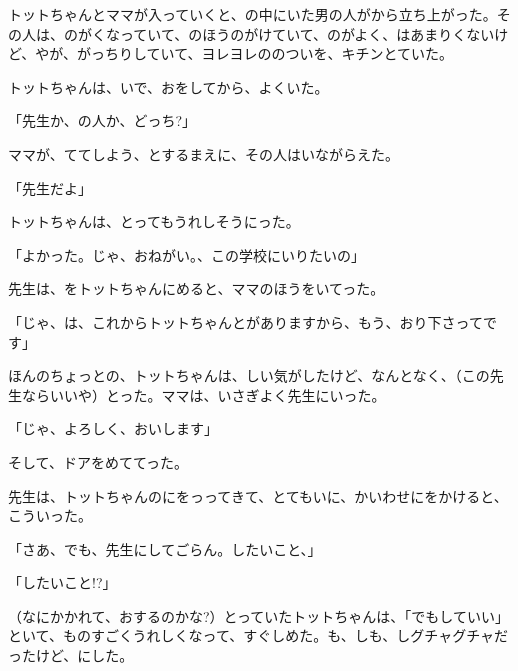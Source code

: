トットちゃんとママが入っていくと、の中にいた男の人がから立ち上がった。その人は、のがくなっていて、のほうのがけていて、のがよく、はあまりくないけど、やが、がっちりしていて、ヨレヨレののついを、キチンとていた。

トットちゃんは、いで、おをしてから、よくいた。

「先生か、の人か、どっち?」

ママが、ててしよう、とするまえに、その人はいながらえた。

「先生だよ」

トットちゃんは、とってもうれしそうにった。

「よかった。じゃ、おねがい。、この学校にいりたいの」

先生は、をトットちゃんにめると、ママのほうをいてった。

「じゃ、は、これからトットちゃんとがありますから、もう、おり下さってです」

ほんのちょっとの、トットちゃんは、しい気がしたけど、なんとなく、（この先生ならいいや）とった。ママは、いさぎよく先生にいった。

「じゃ、よろしく、おいします」

そして、ドアをめててった。

先生は、トットちゃんのにをっってきて、とてもいに、かいわせにをかけると、こういった。

「さあ、でも、先生にしてごらん。したいこと、」

「したいこと!?」

（なにかかれて、おするのかな?）とっていたトットちゃんは、「でもしていい」といて、ものすごくうれしくなって、すぐしめた。も、しも、しグチャグチャだったけど、にした。

